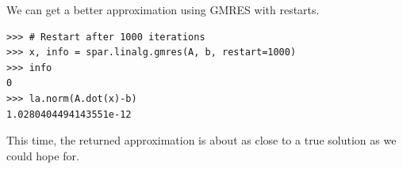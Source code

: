 We can get a better approximation using GMRES with restarts.
\begin{lstlisting}
>>> # Restart after 1000 iterations
>>> x, info = spar.linalg.gmres(A, b, restart=1000)
>>> info
0
>>> la.norm(A.dot(x)-b)
1.0280404494143551e-12
\end{lstlisting}
This time, the returned approximation  is about as close to a true solution as we could hope for.


